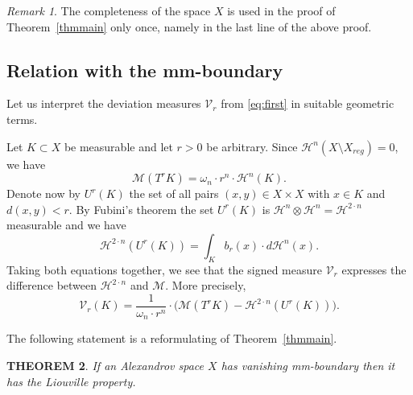\documentclass[12pt,leqno,intlimits]{amsart}
\numberwithin{equation}{section}
\newtheorem{thm}{THEOREM}[section]
\theoremstyle{definition}
\theoremstyle{remark}
\newtheorem{rem}[thm]{Remark}
\newcommand{\tref}[1]{Theorem~\ref{#1}}
\begin{document}
\begin{rem}
The completeness of the space $X$ is used in the proof of \tref{thmmain} only once, namely in the last line of the above proof.
\end{rem}

\subsection{Relation with the mm-boundary} Let us interpret the deviation measures $\mathcal{V}_r$ from \eqref{eq:first} in suitable geometric terms.

Let $K\subset X$ be measurable and let $r>0$ be arbitrary.
Since $\mathcal H^n (X\setminus X_{reg} )=0$, we have
$$\mathcal M (T^{r} K) =\omega _n \cdot r^n \cdot \mathcal H^n (K).$$
Denote now by $U^r(K)$
the set of all pairs $(x,y)\in X\times X$ with $x\in K$ and $d(x,y)<r$.
By Fubini's theorem the set $U^r(K)$ is $\mathcal H^n \otimes \mathcal H^n =\mathcal H^{2\cdot n}$ measurable and we have
$$\mathcal H^{2\cdot n} (U^r (K))= \int _K b_r (x) \cdot d\mathcal H^n (x). $$
Taking both equations together, we see that the signed measure $\mathcal{V}_r$ expresses the difference between $\mathcal H^{2\cdot n}$ and $\mathcal M$. More precisely,
\begin{equation} \label{eq:compare}
\mathcal{V}_r (K) = \frac 1 {\omega_n \cdot r^n}\cdot \Big(\mathcal M (T^r K)- \mathcal H^{2\cdot n} (U^r (K)) \Big).
\end{equation}

The following statement is a reformulating of \tref{thmmain}.

\begin{thm} \label{reform}
If an Alexandrov space $X$ has vanishing  mm-boundary then it has the Liouville property.
\end{thm}
\end{document}
